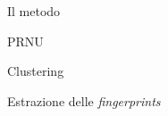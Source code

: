 
\begin{tframe}{Il metodo}


\end{tframe}


\begin{tframe}{PRNU}


\end{tframe}


\begin{tframe}{Clustering}


\end{tframe}

\begin{tframe}{Estrazione delle \emph{fingerprints}}


\end{tframe}